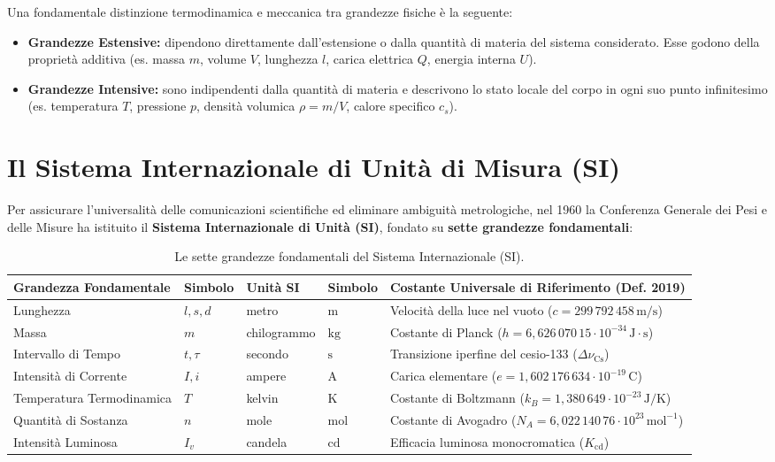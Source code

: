 \documentclass[11pt,a4paper,oneside]{report}
\begin{document}
\begin{commento}
Una fondamentale distinzione termodinamica e meccanica tra grandezze fisiche è la seguente:
\begin{itemize}
  \item \textbf{Grandezze Estensive:} dipendono direttamente dall'estensione o dalla quantità di materia del sistema considerato. Esse godono della proprietà additiva (es. massa $m$, volume $V$, lunghezza $l$, carica elettrica $Q$, energia interna $U$).
  \item \textbf{Grandezze Intensive:} sono indipendenti dalla quantità di materia e descrivono lo stato locale del corpo in ogni suo punto infinitesimo (es. temperatura $T$, pressione $p$, densità volumica $\rho = m/V$, calore specifico $c_s$).
\end{itemize}
\end{commento}

\section{Il Sistema Internazionale di Unità di Misura (SI)}
Per assicurare l'universalità delle comunicazioni scientifiche ed eliminare ambiguità metrologiche, nel 1960 la Conferenza Generale dei Pesi e delle Misure ha istituito il \textbf{Sistema Internazionale di Unità (SI)}, fondato su \textbf{sette grandezze fondamentali}:

\begin{table}[htbp]
\centering
\small
\renewcommand{\arraystretch}{1.25}
\begin{tabularx}{\textwidth}{llllX}
\toprule
\textbf{Grandezza Fondamentale} & \textbf{Simbolo} & \textbf{Unità SI} & \textbf{Simbolo} & \textbf{Costante Universale di Riferimento (Def. 2019)} \\
\midrule
Lunghezza & $l, s, d$ & metro & $\text{m}$ & Velocità della luce nel vuoto ($c = 299\,792\,458\,\text{m/s}$) \\
Massa & $m$ & chilogrammo & $\text{kg}$ & Costante di Planck ($h = 6{,}626\,070\,15 \cdot 10^{-34}\,\text{J}\cdot\text{s}$) \\
Intervallo di Tempo & $t, \tau$ & secondo & $\text{s}$ & Transizione iperfine del cesio-133 ($\Delta\nu_{\text{Cs}}$) \\
Intensità di Corrente & $I, i$ & ampere & $\text{A}$ & Carica elementare ($e = 1{,}602\,176\,634 \cdot 10^{-19}\,\text{C}$) \\
Temperatura Termodinamica & $T$ & kelvin & $\text{K}$ & Costante di Boltzmann ($k_B = 1{,}380\,649 \cdot 10^{-23}\,\text{J/K}$) \\
Quantità di Sostanza & $n$ & mole & $\text{mol}$ & Costante di Avogadro ($N_A = 6{,}022\,140\,76 \cdot 10^{23}\,\text{mol}^{-1}$) \\
Intensità Luminosa & $I_v$ & candela & $\text{cd}$ & Efficacia luminosa monocromatica ($K_{\text{cd}}$) \\
\bottomrule
\end{tabularx}
\caption{Le sette grandezze fondamentali del Sistema Internazionale (SI).}
\label{tab:grandezze_si}
\end{table}
\end{document}
